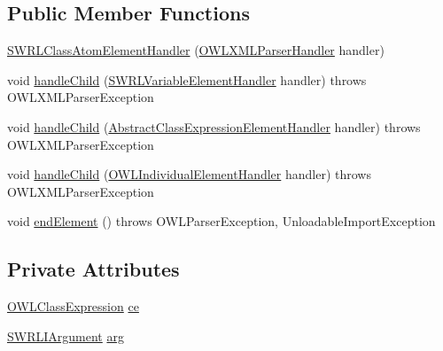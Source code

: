 \subsection*{Public Member Functions}
\begin{DoxyCompactItemize}
\item 
\hyperlink{classorg_1_1coode_1_1owlapi_1_1owlxmlparser_1_1_s_w_r_l_class_atom_element_handler_afe29521e744b7b63971ca78887351b26}{S\-W\-R\-L\-Class\-Atom\-Element\-Handler} (\hyperlink{classorg_1_1coode_1_1owlapi_1_1owlxmlparser_1_1_o_w_l_x_m_l_parser_handler}{O\-W\-L\-X\-M\-L\-Parser\-Handler} handler)
\item 
void \hyperlink{classorg_1_1coode_1_1owlapi_1_1owlxmlparser_1_1_s_w_r_l_class_atom_element_handler_a372c711522f07c40961213a01dbe9672}{handle\-Child} (\hyperlink{classorg_1_1coode_1_1owlapi_1_1owlxmlparser_1_1_s_w_r_l_variable_element_handler}{S\-W\-R\-L\-Variable\-Element\-Handler} handler)  throws O\-W\-L\-X\-M\-L\-Parser\-Exception 
\item 
void \hyperlink{classorg_1_1coode_1_1owlapi_1_1owlxmlparser_1_1_s_w_r_l_class_atom_element_handler_a9d6982058f9d76b20d18aed904498972}{handle\-Child} (\hyperlink{classorg_1_1coode_1_1owlapi_1_1owlxmlparser_1_1_abstract_class_expression_element_handler}{Abstract\-Class\-Expression\-Element\-Handler} handler)  throws O\-W\-L\-X\-M\-L\-Parser\-Exception 
\item 
void \hyperlink{classorg_1_1coode_1_1owlapi_1_1owlxmlparser_1_1_s_w_r_l_class_atom_element_handler_a20f0722b5857c8110cb5a4bbe033d2b8}{handle\-Child} (\hyperlink{classorg_1_1coode_1_1owlapi_1_1owlxmlparser_1_1_o_w_l_individual_element_handler}{O\-W\-L\-Individual\-Element\-Handler} handler)  throws O\-W\-L\-X\-M\-L\-Parser\-Exception 
\item 
void \hyperlink{classorg_1_1coode_1_1owlapi_1_1owlxmlparser_1_1_s_w_r_l_class_atom_element_handler_a361d153a6734f4c62d9316746e3bfd90}{end\-Element} ()  throws O\-W\-L\-Parser\-Exception, Unloadable\-Import\-Exception 
\end{DoxyCompactItemize}
\subsection*{Private Attributes}
\begin{DoxyCompactItemize}
\item 
\hyperlink{interfaceorg_1_1semanticweb_1_1owlapi_1_1model_1_1_o_w_l_class_expression}{O\-W\-L\-Class\-Expression} \hyperlink{classorg_1_1coode_1_1owlapi_1_1owlxmlparser_1_1_s_w_r_l_class_atom_element_handler_aed20570918c743b9bfa1ec28bafd15a8}{ce}
\item 
\hyperlink{interfaceorg_1_1semanticweb_1_1owlapi_1_1model_1_1_s_w_r_l_i_argument}{S\-W\-R\-L\-I\-Argument} \hyperlink{classorg_1_1coode_1_1owlapi_1_1owlxmlparser_1_1_s_w_r_l_class_atom_element_handler_af922ad7b813053cbeccb38f1325e6325}{arg}
\end{DoxyCompactItemize}



